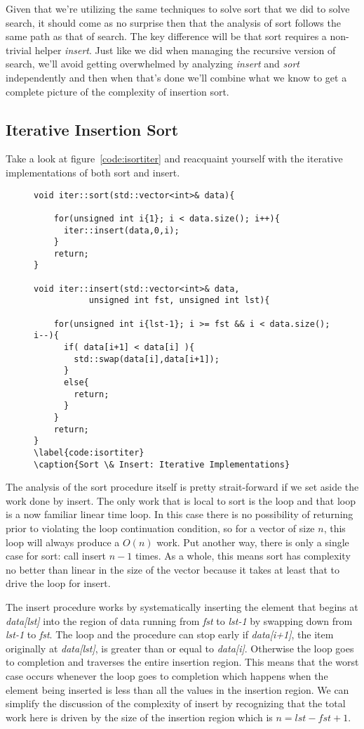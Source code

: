 \documentclass[]{tufte-handout}
\begin{document}
Given that we're utilizing the same techniques to solve sort that we did to solve search, it should come as no surprise then that the analysis of sort follows the same path as that of search. The key difference will be that sort requires a non-trivial helper \textit{insert}. Just like we did when managing the recursive version of search, we'll avoid getting overwhelmed by analyzing \textit{insert} and \textit{sort} independently and then when that's done we'll combine what we know to get a complete picture of the complexity of insertion sort.

\subsection{Iterative Insertion Sort}

Take a look at figure~\ref{code:isortiter} and reacquaint yourself with the iterative implementations of both sort and insert.
\begin{figure}
\begin{lstlisting}
void iter::sort(std::vector<int>& data){

    for(unsigned int i{1}; i < data.size(); i++){
      iter::insert(data,0,i);
    }
    return;
}

void iter::insert(std::vector<int>& data,
		   unsigned int fst, unsigned int lst){

    for(unsigned int i{lst-1}; i >= fst && i < data.size(); i--){
      if( data[i+1] < data[i] ){
		std::swap(data[i],data[i+1]);
      }
      else{
		return;
      }
    }
    return;
}
\label{code:isortiter}
\caption{Sort \& Insert: Iterative Implementations}
\end{lstlisting}
\end{figure}

The analysis of the sort procedure itself is pretty strait-forward if we set aside the work done by insert. The only work that is local to sort is the loop and that loop is a now familiar linear time loop. In this case there is no possibility of returning prior to violating the loop continuation condition, so for a vector of size $n$, this loop will always produce a $O(n)$ work. Put another way, there is only a single case for sort: call insert $n-1$ times. As a whole, this means sort has complexity no better than linear in the size of the vector because it takes at least that to drive the loop for insert.

The insert procedure works by systematically inserting the element that begins at \textit{data[lst]} into the region of data running from \textit{fst} to \textit{lst-1} by swapping down from \textit{lst-1} to \textit{fst}. The loop and the procedure can stop early if \textit{data[i+1]}, the item originally at \textit{data[lst]}, is greater than or equal to \textit{data[i]}. Otherwise the loop goes to completion and traverses the entire insertion region. This means that the worst case occurs whenever the loop goes to completion which happens when the element being inserted is less than all the values in the insertion region. We can simplify the discussion of the complexity of insert by recognizing that the total work here is driven by the size of the insertion region which is $n=lst-fst+1$.
\end{document}
